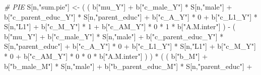 \documentclass[
]{book}
\newenvironment{Shaded}{\begin{snugshade}}{\end{snugshade}}
\newcommand{\CommentTok}[1]{\textcolor[rgb]{0.56,0.35,0.01}{\textit{#1}}}
\newcommand{\DecValTok}[1]{\textcolor[rgb]{0.00,0.00,0.81}{#1}}
\newcommand{\NormalTok}[1]{#1}
\newcommand{\OtherTok}[1]{\textcolor[rgb]{0.56,0.35,0.01}{#1}}
\newcommand{\SpecialCharTok}[1]{\textcolor[rgb]{0.00,0.00,0.00}{#1}}
\newcommand{\StringTok}[1]{\textcolor[rgb]{0.31,0.60,0.02}{#1}}
\begin{document}
\begin{Shaded}
\begin{Highlighting}[]
    \CommentTok{\# PIE }
\NormalTok{    S[n,}\StringTok{"sum.pie"}\NormalTok{] }\OtherTok{\textless{}{-}}\NormalTok{ ( ( b[}\StringTok{"mu\_Y"}\NormalTok{] }\SpecialCharTok{+} 
\NormalTok{                            b[}\StringTok{"c\_male\_Y"}\NormalTok{] }\SpecialCharTok{*}\NormalTok{ S[n,}\StringTok{"male"}\NormalTok{] }\SpecialCharTok{+} 
\NormalTok{                            b[}\StringTok{"c\_parent\_educ\_Y"}\NormalTok{] }\SpecialCharTok{*}\NormalTok{ S[n,}\StringTok{"parent\_educ"}\NormalTok{] }\SpecialCharTok{+} 
\NormalTok{                            b[}\StringTok{"c\_A\_Y"}\NormalTok{] }\SpecialCharTok{*} \DecValTok{0} \SpecialCharTok{+} 
\NormalTok{                            b[}\StringTok{"c\_L1\_Y"}\NormalTok{] }\SpecialCharTok{*}\NormalTok{ S[n,}\StringTok{"L1"}\NormalTok{] }\SpecialCharTok{+}
\NormalTok{                            b[}\StringTok{"c\_M\_Y"}\NormalTok{] }\SpecialCharTok{*} \DecValTok{1} \SpecialCharTok{+}
\NormalTok{                            b[}\StringTok{"c\_AM\_Y"}\NormalTok{] }\SpecialCharTok{*} \DecValTok{0} \SpecialCharTok{*} \DecValTok{1} \SpecialCharTok{*}\NormalTok{ b[}\StringTok{"A.M.inter"}\NormalTok{] ) }\SpecialCharTok{{-}} 
\NormalTok{                          ( b[}\StringTok{"mu\_Y"}\NormalTok{] }\SpecialCharTok{+} 
\NormalTok{                              b[}\StringTok{"c\_male\_Y"}\NormalTok{] }\SpecialCharTok{*}\NormalTok{ S[n,}\StringTok{"male"}\NormalTok{] }\SpecialCharTok{+} 
\NormalTok{                              b[}\StringTok{"c\_parent\_educ\_Y"}\NormalTok{] }\SpecialCharTok{*}\NormalTok{ S[n,}\StringTok{"parent\_educ"}\NormalTok{] }\SpecialCharTok{+} 
\NormalTok{                              b[}\StringTok{"c\_A\_Y"}\NormalTok{] }\SpecialCharTok{*} \DecValTok{0} \SpecialCharTok{+} 
\NormalTok{                              b[}\StringTok{"c\_L1\_Y"}\NormalTok{] }\SpecialCharTok{*}\NormalTok{ S[n,}\StringTok{"L1"}\NormalTok{] }\SpecialCharTok{+}
\NormalTok{                              b[}\StringTok{"c\_M\_Y"}\NormalTok{] }\SpecialCharTok{*} \DecValTok{0} \SpecialCharTok{+}
\NormalTok{                              b[}\StringTok{"c\_AM\_Y"}\NormalTok{] }\SpecialCharTok{*} \DecValTok{0} \SpecialCharTok{*} \DecValTok{0} \SpecialCharTok{*}\NormalTok{ b[}\StringTok{"A.M.inter"}\NormalTok{] ) ) }\SpecialCharTok{*}
\NormalTok{      ( ( b[}\StringTok{"b\_M"}\NormalTok{] }\SpecialCharTok{+} 
\NormalTok{            b[}\StringTok{"b\_male\_M"}\NormalTok{] }\SpecialCharTok{*}\NormalTok{ S[n,}\StringTok{"male"}\NormalTok{] }\SpecialCharTok{+} 
\NormalTok{            b[}\StringTok{"b\_parent\_educ\_M"}\NormalTok{] }\SpecialCharTok{*}\NormalTok{ S[n,}\StringTok{"parent\_educ"}\NormalTok{] }\SpecialCharTok{+} 

\end{Highlighting}
\end{Shaded}
\end{document}
